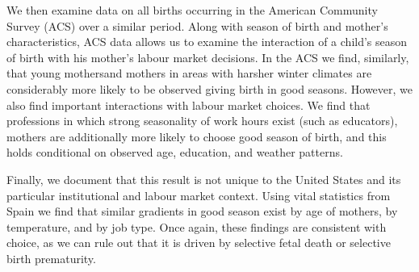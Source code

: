 \documentclass[a4paper, 12 pt]{article}
\theoremstyle{plain}
\begin{document}
\begin{doublespace}
We then examine data on all births occurring in the American Community Survey (ACS) over a similar period.  Along with season of birth and mother's characteristics, ACS data allows us to examine the interaction of a child's season of birth with his mother's labour market decisions.  In the ACS we find, similarly, that young mothersand mothers in areas with harsher winter climates are considerably more likely to be observed giving birth in good seasons.  However, we also find important interactions with labour market choices.  We find that professions in which strong seasonality of work hours exist (such as educators), mothers are additionally more likely to choose good season of birth, and this holds conditional on observed age, education, and weather patterns.

Finally, we document that this result is not unique to the United States and its particular institutional and labour market context.  Using vital statistics from Spain we find that similar gradients in good season exist by age of mothers, by temperature, and by job type.  Once again, these findings are consistent with choice, as we can rule out that it is driven by selective fetal death or selective birth prematurity.




\end{doublespace}
\end{document}
